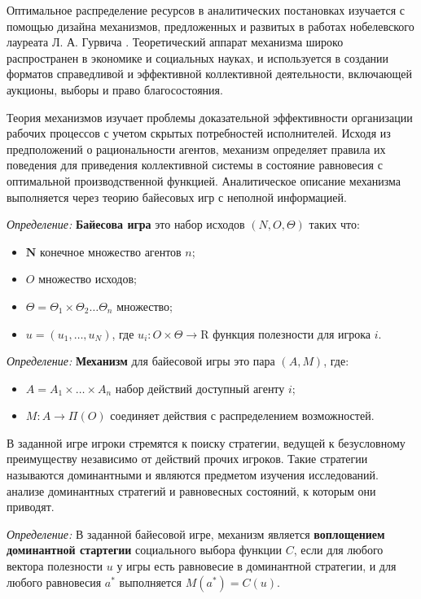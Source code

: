Оптимальное распределение ресурсов в аналитических постановках изучается с помощью дизайна механизмов,
предложенных и развитых в работах нобелевского лауреата Л. А. Гурвича  \cite{hurwicz1960optimality}.
Теоретический аппарат механизма широко распространен в экономике и социальных науках, и используется в создании форматов
справедливой и эффективной коллективной деятельности, включающей аукционы, выборы и право благосостояния.

Теория механизмов изучает проблемы доказательной эффективности организации рабочих процессов с учетом
скрытых потребностей исполнителей. Исходя из предположений о рациональности агентов,
механизм определяет правила их поведения для приведения коллективной системы в состояние 
равновесия с оптимальной производственной функцией. Аналитическое описание механизма выполняется через
теорию байесовых игр с неполной информацией.

\textit{Определение:} \textbf{Байесова игра} это набор исходов $(N,O,\Theta)$ таких что:
\begin{itemize}
    \item $\mathbf{N}$ конечное множество агентов $n$;
    \item $O$ множество исходов;
    \item  $\Theta = \Theta_1 \times \Theta_2 \dots \Theta_n $ множество; 
    \item $u = (u_1, \dots, u_N)$, где $u_i: O \times \Theta \rightarrow \mathrm{R}$  функция полезности для игрока $i$.
\end{itemize}

\textit{Определение:} \textbf{Механизм} для байесовой игры это пара $(A,M)$, где: 
\begin{itemize}
    \item $A = A_1 \times \dots \times A_n$ набор действий доступный агенту $i$;
    \item $M: A \rightarrow \Pi(O)$ соединяет действия с распределением возможностей.
\end{itemize}

В заданной игре игроки стремятся к поиску стратегии, ведущей к безусловному преимуществу независимо от
действий прочих игроков. Такие стратегии называются доминантными и являются предметом изучения исследований. 
анализе доминантных стратегий и равновесных состояний, к которым они приводят. 

\textit{Определение:} В заданной байесовой игре, механизм является \textbf{воплощением доминантной стартегии} 
социального выбора функции $C$, если для любого вектора полезности $u$ у игры есть равновесие в 
доминантной стратегии, и для любого равновесия $a^*$ выполняется $M(a^*) = C(u)$.

